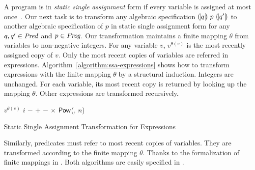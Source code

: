 
A program is in \emph{static single assignment} form if every variable
is assigned at most once~\cite{AWZ:88:DQVP}.
Our next task is to transform any algebraic specification
${(\!|}{q}{|\!)}~{p}~{(\!|}{q'}{|\!)}$ to another algebraic specification of $p$ in
static single  assignment form for any $q, q' \in \mathit{Pred}$ and $p \in
\mathit{Prog}$. Our transformation 
maintains a finite mapping $\theta$ from variables to
non-negative integers. For any variable $v$, $v^{\theta(v)}$ is
the most recently assigned copy of $v$. Only the most recent copies of
variables are referred in
expressions. Algorithm~\ref{algorithm:ssa-expressions} shows how 
to transform expressions with the finite mapping $\theta$ by a
structural induction. Integers are unchanged. For each variable, its
most recent copy is returned by looking up the mapping $\theta$. Other
expressions are transformed recursively. 

\vspace{-1em}
\begin{algorithm}
  \begin{algorithmic}[1]
       \Return $v^{\theta(e)}$ \EndCase
       \Return $i$ \EndCase
       \Return $-$ \EndCase
        \Return {} $+$ 
      \EndCase
        \Return {} $-$ 
      \EndCase
        \Return {} $\times$ 
      \EndCase
        \Return $\mbox{\textsf{Pow}}$(, $n$)
      \EndCase
    \EndMatch
    \EndFunction
  \end{algorithmic}
  \caption{Static Single Assignment Transformation for Expressions}
  \label{algorithm:ssa-expressions}
\end{algorithm}
\vspace{-1em}

Similarly, predicates must refer to most recent copies of 
variables. They are transformed according to the finite mapping
$\theta$. Thanks to the formalization of finite mappings in \coq. Both 
algorithms are easily specified in \gallina.

